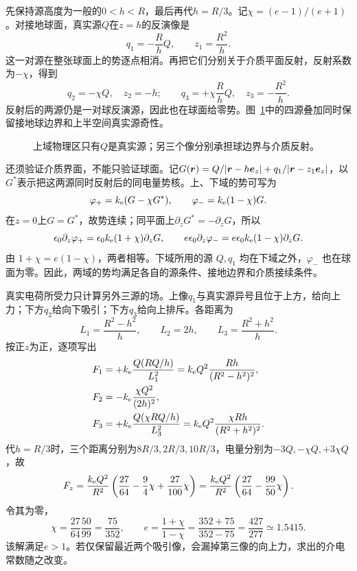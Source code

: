 \begin{solution}
先保持源高度为一般的$0<h<R$，最后再代$h=R/3$。记$\chi=(e-1)/(e+1)$。对接地球面，真实源$Q$在$z=h$的反演像是
\[q_1=-\frac RhQ,\qquad z_1=\frac{R^2}{h}.
\]
这一对源在整张球面上的势逐点相消。再把它们分别关于介质平面反射，反射系数为$-\chi$，得到
\[q_2=-\chi Q,\quad z_2=-h;\qquad
q_3=+\chi\frac RhQ,\quad z_3=-\frac{R^2}{h}.
\]
反射后的两源仍是一对球反演源，因此也在球面给零势。图~\ref{fig:es4-e11-s}中的四源叠加同时保留接地球边界和上半空间真实源奇性。
\begin{figure}[H]\centering
{}
\caption{上域物理区只有$Q$是真实源；另三个像分别承担球边界与介质反射。}\label{fig:es4-e11-s}
\end{figure}
还须验证介质界面，不能只验证球面。记$G(\bm{r})=Q/|\bm{r}-h\bm{e}_z|+q_1/|\bm{r}-z_1\bm{e}_z|$，以$G^*$表示把这两源同时反射后的同电量势核。上、下域的势可写为
\[\varphi_+=k_{\rm e}(G-\chi G^*),\qquad
\varphi_-=k_{\rm e}(1-\chi)G.
\]
在$z=0$上$G=G^*$，故势连续；同平面上$\partial_zG^*=-\partial_zG$，所以
\[\epsilon_0\partial_z\varphi_+=\epsilon_0k_{\rm e}(1+\chi)\partial_zG,
\qquad e\epsilon_0\partial_z\varphi_-=e\epsilon_0k_{\rm e}(1-\chi)\partial_zG.
\]
由 $1+\chi=e(1-\chi)$，两者相等。下域所用的源 $Q,q_1$ 均在下域之外，$\varphi_-$ 也在球面为零。因此，两域的势均满足各自的源条件、接地边界和介质接续条件。

真实电荷所受力只计算另外三源的场。上像$q_1$与真实源异号且位于上方，给向上力；下方$q_2$给向下吸引；下方$q_3$给向上排斥。各距离为
\[L_1=\frac{R^2-h^2}{h},\qquad L_2=2h,\qquad
L_3=\frac{R^2+h^2}{h}.
\]
按正$z$为正，逐项写出
\[\begin{aligned}
F_1&=+k_{\rm e}\frac{Q(RQ/h)}{L_1^2}
=k_{\rm e} Q^2\frac{Rh}{(R^2-h^2)^2},\\
F_2&=-k_{\rm e}\frac{\chi Q^2}{(2h)^2},\\
F_3&=+k_{\rm e}\frac{Q(\chi RQ/h)}{L_3^2}
=k_{\rm e} Q^2\frac{\chi Rh}{(R^2+h^2)^2}.
\end{aligned}\]
代$h=R/3$时，三个距离分别为$8R/3,\allowbreak2R/3,\allowbreak10R/3$，电量分别为$-3Q,\allowbreak-\chi Q,\allowbreak+3\chi Q$，故
\[F_z=\frac{k_{\rm e} Q^2}{R^2}\left(\frac{27}{64}-\frac94\chi+\frac{27}{100}\chi\right)
=\frac{k_{\rm e} Q^2}{R^2}\left(\frac{27}{64}-\frac{99}{50}\chi\right).
\]
令其为零，
\[\chi=\frac{27}{64}\frac{50}{99}=\frac{75}{352},\qquad
e=\frac{1+\chi}{1-\chi}=\frac{352+75}{352-75}
=\boxed{\frac{427}{277}\simeq1.5415}.
\]
该解满足$e>1$。若仅保留最近两个吸引像，会漏掉第三像的向上力，求出的介电常数随之改变。


\end{solution}
